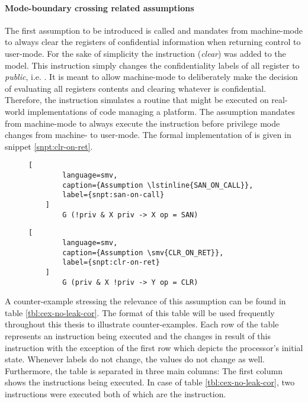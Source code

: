 \paragraph{Mode-boundary crossing related assumptions}
The first assumption to be introduced is called  and mandates from machine-mode to always clear the registers of confidential information when returning control to user-mode.
For the sake of simplicity the instruction  (\textit{clear}) was added to the model.
This instruction simply changes the confidentiality labels of all register to \textit{public}, i.e. .
It is meant to allow machine-mode to deliberately make the decision of evaluating all registers contents and clearing whatever is confidential.
Therefore, the  instruction simulates a routine that might be executed on real-world implementations of code managing a platform.
The  assumption mandates from machine-mode to always execute the  instruction before privilege mode changes from machine- to user-mode.
The formal implementation of  is given in snippet \ref{snpt:clr-on-ret}.

\begin{figure}
    \begin{lstlisting}[
        language=smv,
        caption={Assumption \lstinline{SAN_ON_CALL}},
        label={snpt:san-on-call}
    ]
        G (!priv & X priv -> X op = SAN)
    \end{lstlisting}

    \begin{lstlisting}[
        language=smv,
        caption={Assumption \smv{CLR_ON_RET}},
        label={snpt:clr-on-ret}
    ]
        G (priv & X !priv -> Y op = CLR)
    \end{lstlisting}
\end{figure}

A counter-example stressing the relevance of this assumption can be found in table \ref{tbl:cex-no-leak-cor}.
The format of this table will be used frequently throughout this thesis to illustrate counter-examples.
Each row of the table represents an instruction being executed and the changes in result of this instruction with the exception of the first row which depicts the processor's initial state.
Whenever labels do not change, the values do not change as well.
Furthermore, the table is separated in three main columns: The first column shows the instructions being executed.
In case of table \ref{tbl:cex-no-leak-cor}, two instructions were executed both of which are the  instruction.


